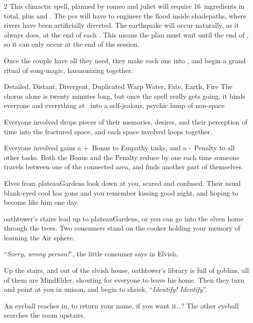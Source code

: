 \begin{multicols}{2}
This climactic spell, planned by \gls{romeo} and \gls{juliet} will require 16~\glspl{ingredient} in total, plus  and .
The \glspl{pc} will have to engineer the \gls{flood} inside \gls{shadepaths}, where rivers have been artificially diverted.
The \gls{earthquake} will occur naturally, as it always does, at the end of each .
This means the plan must wait until the end of \showCycle, so it can only occur at the end of the session.

Once the couple have all they need, they make each one into , and begin a grand ritual of song-magic, harmonizing together.

  {Detailed, Distant, Divergent, Duplicated}%
  {Warp}%
  {Water, Fate, Earth, Fire}%
  {}%
  {The chorus alone is twenty minutes long, but once the spell really gets going, it binds everyone and everything at \spellRange\ into a self-jealous, psychic lump of non-space}%
  {Everyone involved drops pieces of their memories, desires, and their perception of time into the fractured space, and each space involved loops together.

  Everyone involved gains a +~Bonus to Empathy tasks, and a -~Penalty to all other tasks.
  Both the Bonus and the Penalty reduce by one each time someone travels between one of the connected area, and finds another part of themselves.}

\begin{boxtext}
  Elves from \gls{plateauGardens} look down at you, scared and confused.
  Their usual blank-eyed cool has gone and you remember kissing  good night, and hoping to become like him one day.

  \Gls{oathtower}'s stairs lead up to \gls{plateauGardens}, or you can go into the elven home through the trees.
  Two \glspl{consumer} stand on the cooker holding your memory of learning the Air \gls{sphere}.

    ``\textit{Sorry, wrong person!}'', the little \gls{consumer} says in Elvish.

    Up the stairs, and out of the elvish house, \gls{oathtower}'s library is full of goblins, all of them are \gls{MindElder}, shouting for everyone to leave his home.
    Then they turn and point at you in unison, and begin to shriek, ``\textit{Identify! Identify}''.

    An eyeball reaches in, to return your name, if you want it\ldots ?
    The other eyeball searches the room upstairs.


\end{boxtext}
\end{multicols}
